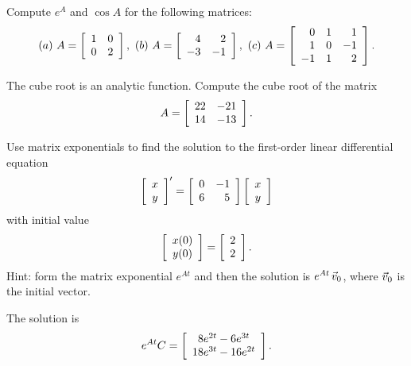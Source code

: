 \documentclass{ximera}
\author{Zack Reed}
\begin{document}
\begin{problem}
  Compute $e^A$ and $\cos A$ for the following matrices:
  \begin{equation*}
    (a)\quad
    A = \startmat{rr}
      1 & 0 \\
      0 & 2 \\
    \stopmat,
    \quad
    (b)\quad
    A = \startmat{rr}
      4  & 2  \\
      -3 & -1 \\
    \stopmat,
    \quad
    (c)\quad
    A = \startmat{rrr}
      0 & 1 & 1 \\
      1 & 0 & -1 \\
      -1 & 1 & 2 \\
    \stopmat.
  \end{equation*}
\end{problem}

\begin{problem}
  The cube root is an analytic function. Compute the cube root of the
  matrix
  \begin{equation*}
    A = \startmat{rr}
      22 & -21 \\
      14 & -13 \\
    \stopmat.
  \end{equation*}
\end{problem}

\begin{problem}
  Use matrix exponentials to find the solution to the
  first-order linear differential equation
  \begin{equation*}
    \startmat{c}
      x \\
      y
    \stopmat^{\prime} = \startmat{rr}
      0 & -1 \\
      6 & 5
    \stopmat \startmat{c}
      x \\
      y
    \stopmat
  \end{equation*}
  with initial value
  \begin{equation*}
    \startmat{c}
      x(0) \\
      y(0)
    \stopmat = \startmat{r}
      2 \\
      2
    \stopmat.
  \end{equation*}
  Hint: form the matrix exponential $e^{At}$ and then the solution is
  $e^{At}\,\vect{v}_0$, where $\vect{v}_0$ is the initial vector.
  \begin{solution}
    The solution is
    \begin{equation*}
      e^{At}C = \startmat{c}
        8e^{2t} - 6e^{3t} \\
        18e^{3t} - 16e^{2t}
      \stopmat.
    \end{equation*}
  \end{solution}
\end{problem}
\end{document}
